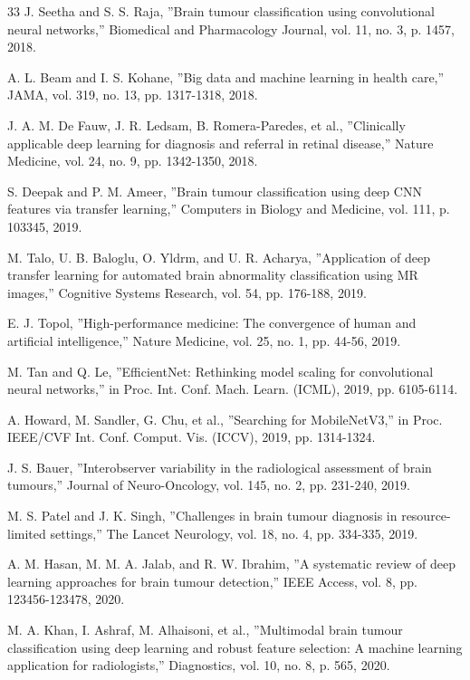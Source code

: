 \documentclass[final,3p,times,number]{elsarticle}
\begin{document}
\begin{thebibliography}{33}
 J. Seetha and S. S. Raja, ''Brain tumour classification using convolutional neural networks,'' Biomedical and Pharmacology Journal, vol. 11, no. 3, p. 1457, 2018.

 A. L. Beam and I. S. Kohane, ''Big data and machine learning in health care,'' JAMA, vol. 319, no. 13, pp. 1317-1318, 2018.

 J. A. M. De Fauw, J. R. Ledsam, B. Romera-Paredes, et al., ''Clinically applicable deep learning for diagnosis and referral in retinal disease,'' Nature Medicine, vol. 24, no. 9, pp. 1342-1350, 2018.

 S. Deepak and P. M. Ameer, ''Brain tumour classification using deep CNN features via transfer learning,'' Computers in Biology and Medicine, vol. 111, p. 103345, 2019.

 M. Talo, U. B. Baloglu, O. Yldrm, and U. R. Acharya, ''Application of deep transfer learning for automated brain abnormality classification using MR images,'' Cognitive Systems Research, vol. 54, pp. 176-188, 2019.

 E. J. Topol, ''High-performance medicine: The convergence of human and artificial intelligence,'' Nature Medicine, vol. 25, no. 1, pp. 44-56, 2019.

 M. Tan and Q. Le, ''EfficientNet: Rethinking model scaling for convolutional neural networks,'' in Proc. Int. Conf. Mach. Learn. (ICML), 2019, pp. 6105-6114.

 A. Howard, M. Sandler, G. Chu, et al., ''Searching for MobileNetV3,'' in Proc. IEEE/CVF Int. Conf. Comput. Vis. (ICCV), 2019, pp. 1314-1324.

 J. S. Bauer, ''Interobserver variability in the radiological assessment of brain tumours,'' Journal of Neuro-Oncology, vol. 145, no. 2, pp. 231-240, 2019.

 M. S. Patel and J. K. Singh, ''Challenges in brain tumour diagnosis in resource-limited settings,'' The Lancet Neurology, vol. 18, no. 4, pp. 334-335, 2019.

 A. M. Hasan, M. M. A. Jalab, and R. W. Ibrahim, ''A systematic review of deep learning approaches for brain tumour detection,'' IEEE Access, vol. 8, pp. 123456-123478, 2020.

 M. A. Khan, I. Ashraf, M. Alhaisoni, et al., ''Multimodal brain tumour classification using deep learning and robust feature selection: A machine learning application for radiologists,'' Diagnostics, vol. 10, no. 8, p. 565, 2020.


\end{thebibliography}
\end{document}
